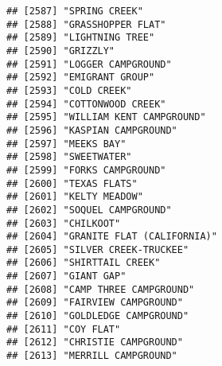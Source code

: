 \documentclass[
]{article}
\begin{document}
\begin{verbatim}
## [2587] "SPRING CREEK"                                                                        
## [2588] "GRASSHOPPER FLAT"                                                                    
## [2589] "LIGHTNING TREE"                                                                      
## [2590] "GRIZZLY"                                                                             
## [2591] "LOGGER CAMPGROUND"                                                                   
## [2592] "EMIGRANT GROUP"                                                                      
## [2593] "COLD CREEK"                                                                          
## [2594] "COTTONWOOD CREEK"                                                                    
## [2595] "WILLIAM KENT CAMPGROUND"                                                             
## [2596] "KASPIAN CAMPGROUND"                                                                  
## [2597] "MEEKS BAY"                                                                           
## [2598] "SWEETWATER"                                                                          
## [2599] "FORKS CAMPGROUND"                                                                    
## [2600] "TEXAS FLATS"                                                                         
## [2601] "KELTY MEADOW"                                                                        
## [2602] "SOQUEL CAMPGROUND"                                                                   
## [2603] "CHILKOOT"                                                                            
## [2604] "GRANITE FLAT (CALIFORNIA)"                                                           
## [2605] "SILVER CREEK-TRUCKEE"                                                                
## [2606] "SHIRTTAIL CREEK"                                                                     
## [2607] "GIANT GAP"                                                                           
## [2608] "CAMP THREE CAMPGROUND"                                                               
## [2609] "FAIRVIEW CAMPGROUND"                                                                 
## [2610] "GOLDLEDGE CAMPGROUND"                                                                
## [2611] "COY FLAT"                                                                            
## [2612] "CHRISTIE CAMPGROUND"                                                                 
## [2613] "MERRILL CAMPGROUND"                                                                  

\end{verbatim}
\end{document}
